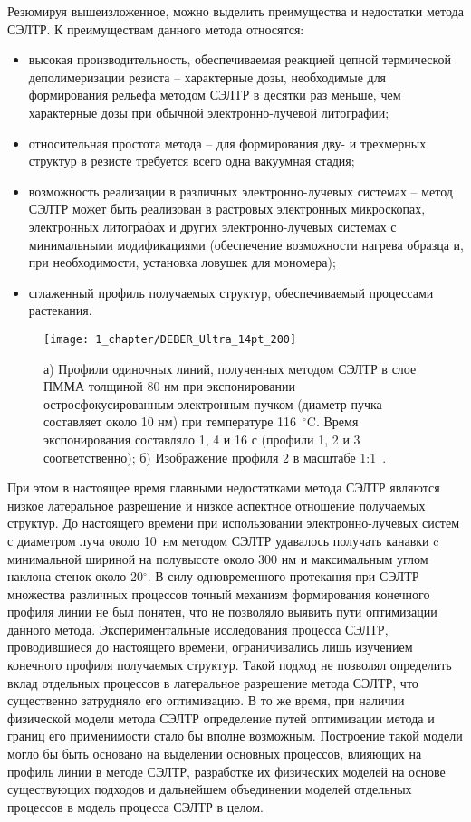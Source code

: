 Резюмируя вышеизложенное, можно выделить преимущества и недостатки метода СЭЛТР.
К преимуществам данного метода относятся:
\begin{itemize}
	\item высокая производительность, обеспечиваемая реакцией цепной термической деполимеризации резиста -- характерные дозы, необходимые для формирования рельефа методом СЭЛТР в десятки раз меньше, чем характерные дозы при обычной электронно-лучевой литографии;
	\item относительная простота метода -- для формирования дву- и трехмерных структур в резисте требуется всего одна вакуумная стадия;
	\item возможность реализации в различных электронно-лучевых системах -- метод СЭЛТР может быть реализован в растровых электронных микроскопах, электронных литографах и других электронно-лучевых системах с минимальными модификациями (обеспечение возможности нагрева образца и, при необходимости, установка ловушек для мономера);
	\item сглаженный профиль получаемых структур, обеспечиваемый процессами растекания.
\end{itemize}

\begin{figure}[t]
	\centering
	\texttt{[image: 1\_chapter/DEBER\_Ultra\_14pt\_200]}
	\caption{а) Профили одиночных линий, полученных методом СЭЛТР в слое ПММА толщиной 80 нм при экспонировании остросфокусированным электронным пучком (диаметр пучка составляет около 10 нм) при температуре 116~$^\circ$C. Время экспонирования составляло 1, 4 и 16 с (профили 1, 2 и 3 соответственно); б) Изображение профиля 2 в масштабе 1:1~\cite{Bruk_2016_mee}.}
	\label{fig:DEBER_Ultra}
\end{figure}

При этом в настоящее время главными недостатками метода СЭЛТР являются низкое латеральное разрешение и низкое аспектное отношение получаемых структур.
До настоящего времени при использовании электронно-лучевых систем с диаметром луча около 10~нм методом СЭЛТР удавалось получать канавки c минимальной шириной на полувысоте около 300 нм и максимальным углом наклона стенок около 20$^\circ$.
В силу одновременного протекания при СЭЛТР множества различных процессов точный механизм формирования конечного профиля линии не был понятен, что не позволяло выявить пути оптимизации данного метода.
Экспериментальные исследования процесса СЭЛТР, проводившиеся до настоящего времени, ограничивались лишь изучением конечного профиля получаемых структур.
Такой подход не позволял определить вклад отдельных процессов в латеральное разрешение метода СЭЛТР, что существенно затрудняло его оптимизацию.
В то же время, при наличии физической модели метода СЭЛТР определение путей оптимизации метода и границ его применимости стало бы вполне возможным.
Построение такой модели могло бы быть основано на выделении основных процессов, влияющих на профиль линии в методе СЭЛТР, разработке их физических моделей на основе существующих подходов и дальнейшем объединении моделей отдельных процессов в модель процесса СЭЛТР в целом.
